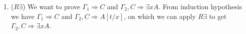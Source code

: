 \documentclass[a4paper, 12pt]{paper}
\begin{document}
\begin{enumerate}
    \item ($R \exists$) We want to prove $\Gamma_1 \Rightarrow C$ and $\Gamma_2, C \Rightarrow \exists x A$. From induction hypothesis we have $\Gamma_1 \Rightarrow C$ and $\Gamma_2, C \Rightarrow A[t / x]$, on which we can apply $R \exists$ to get $\Gamma_2, C \Rightarrow \exists x A$.
\end{enumerate}
\end{document}
